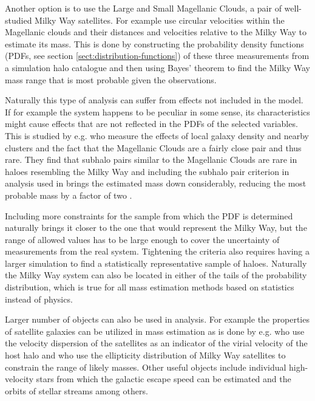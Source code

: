 \documentclass[english, oneside]{HYgradu}
\begin{document}
Another option is to use the Large and Small Magellanic Clouds, a pair of well-studied Milky Way satellites. For example \citet{busha2011mass} use circular velocities within the Magellanic clouds and their distances and velocities relative to the Milky Way to estimate its mass. This is done by constructing the probability density functions (PDFs, see section \ref{sect:distribution-functions}) of these three measurements from a simulation halo catalogue and then using Bayes' theorem to find the Milky Way mass range that is most probable given the observations.

Naturally this type of analysis can suffer from effects not included in the model. If for example the system happens to be peculiar in some sense, its characteristics might cause effects that are not reflected in the PDFs of the selected variables. This is studied by e.g. \citet{gonzalez2013satellites} who measure the effects of local galaxy density and nearby clusters and the fact that the Magellanic Clouds are a fairly close pair and thus rare. They find that subhalo pairs similar to the Magellanic Clouds are rare in haloes resembling the Milky Way and including the subhalo pair criterion in analysis used in \citet{busha2011mass} brings the estimated mass down considerably, reducing the most probable mass by a factor of two \citep{gonzalez2013satellites}.

Including more constraints for the sample from which the PDF is determined naturally brings it closer to the one that would represent the Milky Way, but the range of allowed values has to be large enough to cover the uncertainty of measurements from the real system. Tightening the criteria also requires having a larger simulation to find a statistically representative sample of haloes. Naturally the Milky Way system can also be located in either of the tails of the probability distribution, which is true for all mass estimation methods based on statistics instead of physics.

Larger number of objects can also be used in analysis. For example the properties of satellite galaxies can be utilized in mass estimation as is done by e.g. \citet{sales2007satellites} who use the velocity dispersion of the satellites as an indicator of the virial velocity of the host halo and \citet{barber2013orbital} who use the ellipticity distribution of Milky Way satellites to constrain the range of likely masses. Other useful objects include individual high-velocity stars from which the galactic escape speed can be estimated \citep{piffl2014rave} and the orbits of stellar streams \citep{newberg2010orbit} among others.
\end{document}
